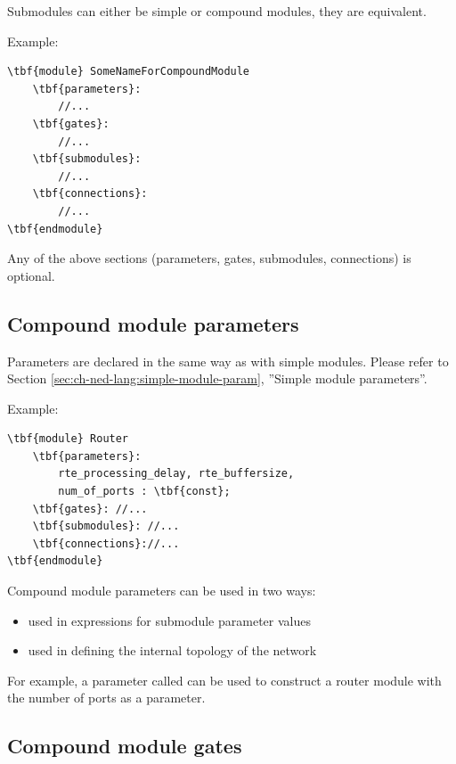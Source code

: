 Submodules can either be simple or
compound modules, they are equivalent.


Example:

\begin{Verbatim}[commandchars=\\\{\}]
\tbf{module} SomeNameForCompoundModule
    \tbf{parameters}:
        //...
    \tbf{gates}:
        //...
    \tbf{submodules}:
        //...
    \tbf{connections}:
        //...
\tbf{endmodule}
\end{Verbatim}

Any of the above sections (parameters, gates, submodules, connections)
is optional.





\subsection{Compound module parameters}


Parameters are declared in the same
way as with simple modules.  Please refer to
Section \ref{sec:ch-ned-lang:simple-module-param}, ''Simple module
parameters''.


Example:

\begin{Verbatim}[commandchars=\\\{\}]
\tbf{module} Router
    \tbf{parameters}:
        rte_processing_delay, rte_buffersize,
        num_of_ports : \tbf{const};
    \tbf{gates}: //...
    \tbf{submodules}: //...
    \tbf{connections}://...
\tbf{endmodule}
\end{Verbatim}

Compound module parameters can be used in two ways:
\begin{itemize}
\item{used in expressions for submodule parameter values}
\item{used in defining the internal topology of the network}
\end{itemize}

For example, a parameter called  can be used to
construct a router module with the number of ports as a parameter.





\subsection{Compound module gates}


